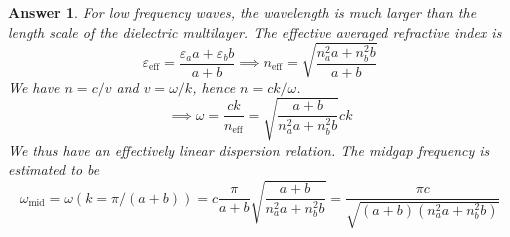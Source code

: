 \documentclass[a4paper]{article}
\newtheorem{ans}{Answer}[section]
\theoremstyle{new}
\begin{document}
\begin{ans}
For low frequency waves, the wavelength is much larger than the length scale of the dielectric multilayer. The effective averaged refractive index is
$$\varepsilon_{\text{eff}}=\frac{\varepsilon_aa+\varepsilon_bb}{a+b}\implies n_{\text{eff}}=\sqrt{\frac{n_a^2a+n_b^2b}{a+b}}$$
We have $n=c/v$ and $v=\omega/k$, hence $n=ck/\omega$.
$$\implies\omega=\frac{ck}{n_{\text{eff}}}=\sqrt{\frac{a+b}{n_a^2a+n_b^2b}}ck$$
We thus have an effectively linear dispersion relation. The midgap frequency is estimated to be
$$\omega_{\text{mid}}=\omega(k=\pi/(a+b))=c\frac{\pi}{a+b}\sqrt{\frac{a+b}{n_a^2a+n_b^2b}}=\frac{\pi c}{\sqrt{(a+b)(n_a^2a+n_b^2b)}}$$
\begin{center}
\end{center}
\end{ans}
\newpage
\end{document}
